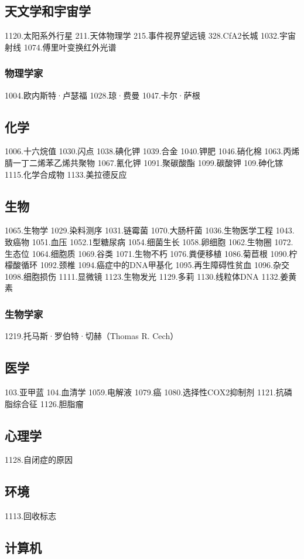 \subsection{天文学和宇宙学}
1120.太阳系外行星
211.天体物理学
215.事件视界望远镜
328.CfA2长城
1032.宇宙射线
1074.傅里叶变换红外光谱
\subsubsection{物理学家}
1004.欧内斯特·卢瑟福
1028.琼·费曼
1047.卡尔·萨根

\subsection{化学}
1006.十六烷值
1030.闪点
1038.碘化钾
1039.合金
1040.钾肥
1046.硝化棉
1063.丙烯腈一丁二烯苯乙烯共聚物
1067.氰化钾
1091.聚碳酸酯
1099.碳酸钾
109.砷化镓
1115.化学合成物
1133.美拉德反应

\subsection{生物}
1065.生物学
1029.染料测序
1031.链霉菌
1070.大肠杆菌
1036.生物医学工程
1043.致癌物
1051.血压
1052.1型糖尿病
1054.细菌生长
1058.卵细胞
1062.生物圈
1072.生态位
1064.细胞质
1069.谷类
1071.生物不朽
1076.粪便移植
1086.菊苣根
1090.柠檬酸循环
1092.颈椎
1094.癌症中的DNA甲基化
1095.再生障碍性贫血
1096.杂交
1098.细胞损伤
1111.显微镜
1123.生物发光
1129.多莉
1130.线粒体DNA
1132.姜黄素
\subsubsection{生物学家}
1219.托马斯·罗伯特·切赫（Thomas R. Cech）

\subsection{医学}
103.亚甲蓝
104.血清学
1059.电解液
1079.癌
1080.选择性COX2抑制剂
1121.抗磷脂综合征
1126.胆脂瘤

\subsection{心理学}
1128.自闭症的原因

\subsection{环境}
1113.回收标志

\subsection{计算机}

